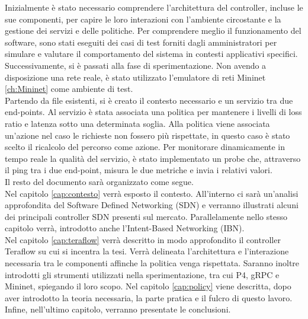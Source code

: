 Inizialmente è stato necessario comprendere l'architettura del controller, incluse le sue componenti, per capire le loro interazioni con l'ambiente circostante e la gestione dei servizi e delle politiche.
Per comprendere meglio il funzionamento del software, sono stati eseguiti dei casi di test forniti dagli amministratori per simulare e valutare il comportamento del sistema in contesti applicativi specifici.
Successivamente, si è passati alla fase di sperimentazione.
Non avendo a disposizione una rete reale, è stato utilizzato l'emulatore di reti Mininet \ref{ch:Mininet} come ambiente di test.
\\Partendo da file esistenti, si è creato il contesto necessario e un servizio tra due end-points.
Al servizio è stata associata una politica per mantenere i livelli di loss ratio e latenza sotto una determinata soglia.
Alla politica viene associata un'azione nel caso le richieste non fossero più rispettate, in questo caso è stato scelto il ricalcolo del percorso come azione.
Per monitorare dinamicamente in tempo reale la qualità del servizio, è stato implementato un probe che, attraverso il ping tra i due end-point, misura le due metriche e invia 
i relativi valori.
\\Il resto del documento sarà organizzato come segue.
\\Nel capitolo \ref{cap:contesto} verrà esposto il contesto. All'interno ci sarà un'analisi approfondita del Software Defined Networking (SDN)
e verranno illustrati alcuni dei principali controller SDN presenti sul mercato. Parallelamente nello stesso capitolo verrà, introdotto anche l'Intent-Based Networking (IBN).
\\Nel capitolo \ref{cap:teraflow} verrà descritto in modo approfondito il controller Teraflow su cui si incentra la tesi.
Verrà delineata l'architettura e l'interazione necessaria tra le componenti affinche la politica venga rispettata.
Saranno inoltre introdotti gli strumenti utilizzati nella sperimentazione, tra cui P4, gRPC e Mininet, spiegando il loro scopo.
Nel capitolo \ref{cap:policy} viene descritta, dopo aver introdotto la teoria necessaria, la parte pratica e il fulcro di questo lavoro.
Infine, nell’ultimo capitolo, verranno presentate le conclusioni.
